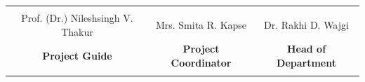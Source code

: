 \begin{certificate}
    
    \begin{table}[b]
        \centering
        \setlength{\tabcolsep}{6 pt}
        \begin{tabu} to \linewidth {C C C}
            {\hrulefill} & {\hrulefill} & {\hrulefill}\\
            {Prof. (Dr.) Nileshsingh V. Thakur} & {Mrs. Smita R. Kapse} & {Dr. Rakhi D. Wajgi}\\
            \textbf{Project Guide} & \textbf{Project Coordinator} & \textbf{Head of Department}\\
            {\vspace{10 pt}}
        \end{tabu}
    \end{table}

    
\end{certificate}